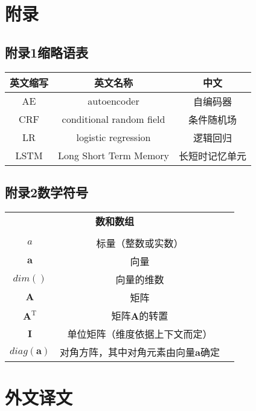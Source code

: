 \documentclass[a4paper,oneside,12pt]{book}
\begin{document}
\chapter*{附\qquad{}录}

{}
\section*{附录1\quad{}缩略语表}
\begin{center}
	\begin{tabular}{ccc}
		\textbf{英文缩写} & \textbf{英文名称} & \textbf{中文} \\
		\hline
		AE & autoencoder & 自编码器\\
		CRF & conditional random field & 条件随机场\\
		LR & logistic regression & 逻辑回归\\
		LSTM & Long Short Term Memory & 长短时记忆单元 \\
	\end{tabular}
\end{center}

{}
\section*{附录2\quad{}数学符号}
\begin{center}
	\begin{tabular}{ccc}
		\multicolumn{2}{c}{\textbf{数和数组}} \\
		\\
		$a$ & 标量（整数或实数）\\
		$\bm{a}$ & 向量\\
		$dim()$ & 向量的维数\\
		$\bm{A}$ & 矩阵\\
		$\bm{A}^\mathrm{T}$ & 矩阵$\textbf{A}$的转置\\
		$\bm{I}$ & 单位矩阵（维度依据上下文而定） \\
 		$diag(\bm{a})$ & 对角方阵，其中对角元素由向量$\bm{a}$确定 \\

	\end{tabular}
\end{center}

\newpage\backmatter
\chapter*{外\quad{}文\quad{}译\quad{}文}
\vspace{8mm}
\end{document}
